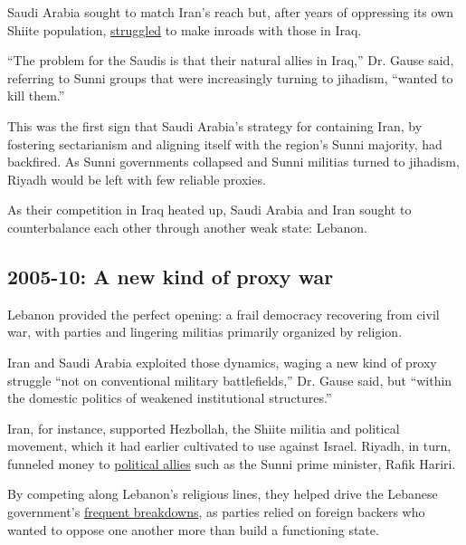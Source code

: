 Saudi Arabia sought to match Iran's reach but, after years of oppressing
its own Shiite population,
\href{https://books.google.com/books?id=2uERDAAAQBAJ\&pg=PT144\&lpg=PT144\&dq=saudi+arabia+allawi\&source=bl\&ots=HXp1i5A9H2\&sig=X5vklAl_0daKB_-1PeuHw-W9F_4\&hl=en\&sa=X\&ved=0ahUKEwjy3NO9_vbPAhVILSYKHeANDv8Q6AEIQjAI\#v=onepage\&q=saudi\%20arabia\%20allawi\&f=false}{struggled}
to make inroads with those in Iraq.

``The problem for the Saudis is that their natural allies in Iraq,'' Dr.
Gause said, referring to Sunni groups that were increasingly turning to
jihadism, ``wanted to kill them.''

This was the first sign that Saudi Arabia's strategy for containing
Iran, by fostering sectarianism and aligning itself with the region's
Sunni majority, had backfired. As Sunni governments collapsed and Sunni
militias turned to jihadism, Riyadh would be left with few reliable
proxies.

As their competition in Iraq heated up, Saudi Arabia and Iran sought to
counterbalance each other through another weak state: Lebanon.

\hypertarget{2005-10-a-new-kind-of-proxy-war}{%
\subsection{2005-10: A new kind of proxy
war}\label{2005-10-a-new-kind-of-proxy-war}}

Lebanon provided the perfect opening: a frail democracy recovering from
civil war, with parties and lingering militias primarily organized by
religion.

Iran and Saudi Arabia exploited those dynamics, waging a new kind of
proxy struggle ``not on conventional military battlefields,'' Dr. Gause
said, but ``within the domestic politics of weakened institutional
structures.''

Iran, for instance, supported Hezbollah, the Shiite militia and
political movement, which it had earlier cultivated to use against
Israel. Riyadh, in turn, funneled money to
\href{http://www.reuters.com/article/us-saudi-lebanon-idUSKCN0X20DG}{political
allies} such as the Sunni prime minister, Rafik Hariri.

By competing along Lebanon's religious lines, they helped drive the
Lebanese government's
\href{https://books.google.com/books?id=TMjmDAAAQBAJ\&pg=PT177\&lpg=PT177\&dq=1990s+saudi+lebanon\&source=bl\&ots=xuVUuq5llQ\&sig=Gh9WwgWd9as9O30u-vVSq4Sgd54\&hl=en\&sa=X\&ved=0ahUKEwi9raSw6_bPAhXL4yYKHfNeBI0Q6AEINjAD\#v=onepage\&q=1990s\%20saudi\%20lebanon\&f=false}{frequent
breakdowns}, as parties relied on foreign backers who wanted to oppose
one another more than build a functioning state.

